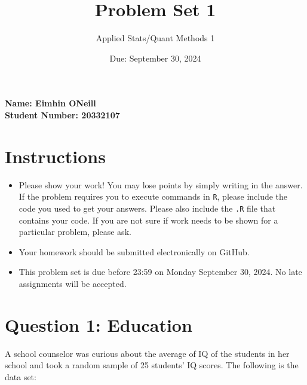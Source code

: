 \documentclass[12pt,letterpaper]{article}
\title{Problem Set 1}
\date{Due: September 30, 2024}
\author{Applied Stats/Quant Methods 1}
\begin{document}
		\maketitle
		\vspace{-2em} 
		\noindent \textbf{Name: Eimhin ONeill} \\
		\noindent \textbf{Student Number: 20332107} \\
		
	
	\section*{Instructions}
	\begin{itemize}
	\item Please show your work! You may lose points by simply writing in the answer. If the problem requires you to execute commands in \texttt{R}, please include the code you used to get your answers. Please also include the \texttt{.R} file that contains your code. If you are not sure if work needs to be shown for a particular problem, please ask.
\item Your homework should be submitted electronically on GitHub.
\item This problem set is due before 23:59 on Monday September 30, 2024. No late assignments will be accepted.
	\end{itemize}
	
	\vspace{1cm}
	\section*{Question 1: Education}

A school counselor was curious about the average of IQ of the students in her school and took a random sample of 25 students' IQ scores. The following is the data set:\\
\vspace{.5cm}

  

\vspace{1cm}
\end{document}
